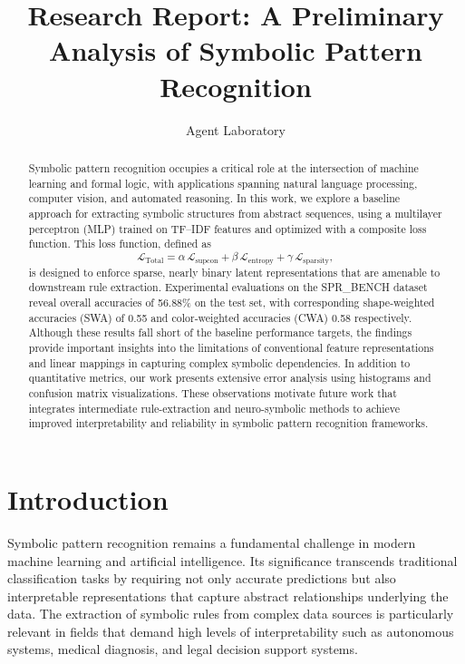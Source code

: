 \documentclass{article}
\title{Research Report: A Preliminary Analysis of Symbolic Pattern Recognition}
\author{Agent Laboratory}
\date{}
\begin{document}
\maketitle

\begin{abstract}
Symbolic pattern recognition occupies a critical role at the intersection of machine learning and formal logic, with applications spanning natural language processing, computer vision, and automated reasoning. In this work, we explore a baseline approach for extracting symbolic structures from abstract sequences, using a multilayer perceptron (MLP) trained on TF–IDF features and optimized with a composite loss function. This loss function, defined as 
\[
\mathcal{L}_{\text{Total}} = \alpha\,\mathcal{L}_{\text{supcon}} + \beta\,\mathcal{L}_{\text{entropy}} + \gamma\,\mathcal{L}_{\text{sparsity}},
\]
is designed to enforce sparse, nearly binary latent representations that are amenable to downstream rule extraction. Experimental evaluations on the SPR\_BENCH dataset reveal overall accuracies of 56.88\% on the test set, with corresponding shape‐weighted accuracies (SWA) of 0.55 and color‐weighted accuracies (CWA) 0.58 respectively. Although these results fall short of the baseline performance targets, the findings provide important insights into the limitations of conventional feature representations and linear mappings in capturing complex symbolic dependencies. In addition to quantitative metrics, our work presents extensive error analysis using histograms and confusion matrix visualizations. These observations motivate future work that integrates intermediate rule-extraction and neuro-symbolic methods to achieve improved interpretability and reliability in symbolic pattern recognition frameworks.
\end{abstract}

\section{Introduction}
Symbolic pattern recognition remains a fundamental challenge in modern machine learning and artificial intelligence. Its significance transcends traditional classification tasks by requiring not only accurate predictions but also interpretable representations that capture abstract relationships underlying the data. The extraction of symbolic rules from complex data sources is particularly relevant in fields that demand high levels of interpretability such as autonomous systems, medical diagnosis, and legal decision support systems.
\end{document}
